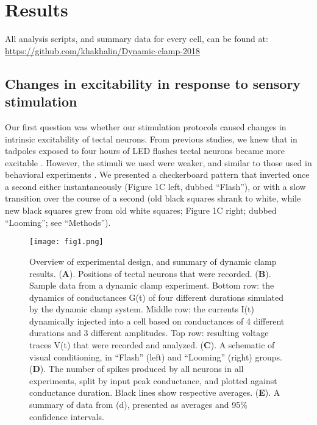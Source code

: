 \documentclass{article}
\begin{document}
\section*{Results}

All analysis scripts, and summary data for every cell, can be found at:  \url{https://github.com/khakhalin/Dynamic-clamp-2018}

\subsection*{Changes in excitability in response to sensory stimulation}

Our first question was whether our stimulation protocols caused changes in intrinsic excitability of tectal neurons. From previous studies, we knew that in tadpoles exposed to four hours of LED flashes tectal neurons became more excitable \citep{aizenman2003,ciarleglio2015}. However, the stimuli we used were weaker, and similar to those used in behavioral experiments \citep{khakhalin2014,james2015,truszkowski2017}. We presented a checkerboard pattern that inverted once a second either instantaneously (Figure 1C left, dubbed “Flash”), or with a slow transition over the course of a second (old black squares shrank to white, while new black squares grew from old white squares; Figure 1C right; dubbed “Looming”; see “Methods”).

\begin{figure*}
\texttt{[image: fig1.png]}
\caption{
Overview of experimental design, and summary of dynamic clamp results. (\textbf{A}). Positions of tectal neurons that were recorded. (\textbf{B}). Sample data from a dynamic clamp experiment. Bottom row: the dynamics of conductances G(t) of four different durations simulated by the dynamic clamp system. Middle row: the currents I(t) dynamically injected into a cell based on conductances of 4 different durations and 3 different amplitudes. Top row: resulting voltage traces V(t) that were recorded and analyzed. (\textbf{C}). A schematic of visual conditioning, in “Flash” (left) and “Looming” (right) groups. (\textbf{D}). The number of spikes produced by all neurons in all experiments, split by input peak conductance, and plotted against conductance duration. Black lines show respective averages. (\textbf{E}). A summary of data from (d), presented as averages and 95\% confidence intervals.}
\end{figure*}
\end{document}
